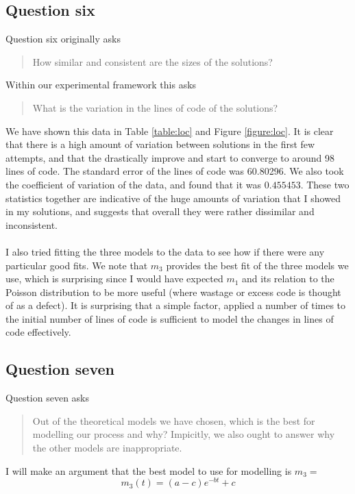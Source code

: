 \subsection{Question six}

Question six originally asks
\begin{quote}
  How similar and consistent are the sizes of the solutions?
\end{quote}

Within our experimental framework this asks
\begin{quote}
  What is the variation in the lines of code of the solutions?
\end{quote}

We have shown this data in Table \ref{table:loc} and Figure \ref{figure:loc}.
It is clear that there is a high amount of variation between solutions in the
first few attempts, and that the drastically improve and start to converge to
around 98 lines of code.
The standard error of the lines of code was 60.80296.
We also took the coefficient of variation of the data, and found that it was
$0.455453$.
These two statistics together are indicative of the huge amounts of variation
that I showed in my solutions, and suggests that overall they were rather
dissimilar and inconsistent.\\
\\
I also tried fitting the three models to the data to see how if there were any
particular good fits.
We note that $m_3$ provides the best fit of the three models we use, which is
surprising since I would have expected $m_1$ and its relation to the Poisson
distribution to be more useful (where wastage or excess code is thought of as a
defect).
It is surprising that a simple factor, applied a number of times to the initial
number of lines of code is sufficient to model the changes in lines of code
effectively.

\subsection{Question seven}

Question seven asks
\begin{quote}
  Out of the theoretical models we have chosen, which is the best for modelling
  our process and why?
  Impicitly, we also ought to answer why the other models are inappropriate.
\end{quote}

I will make an argument that the best model to use for modelling is $m_3 =$
\[
  m_3(t) = (a-c) e^{-bt} + c
\]

